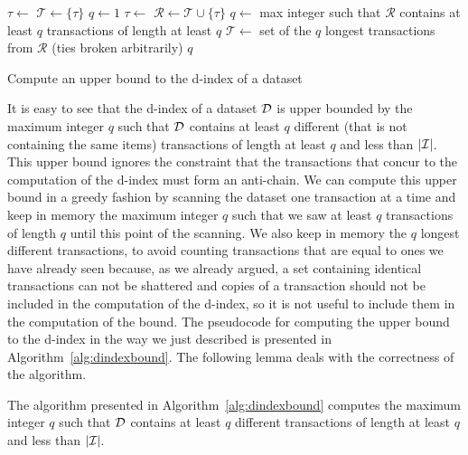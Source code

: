 \begin{algorithm}[htb]
  \DontPrintSemicolon
  $\tau\leftarrow$ \GetNextTransaction{$\Ds$}\;
  $\mathcal{T}\leftarrow\{\tau\}$\;
  $q\leftarrow 1$\;
  \While{\ScanIsNotComplete} {
  $\tau\leftarrow$ \GetNextTransaction{$\Ds$}\;
   {
  $\mathcal{R}\leftarrow \mathcal{T}\cup\{\tau\}$\;
  $q \leftarrow$ max integer such that $\mathcal{R}$ contains at least $q$ transactions
    of length at least $q$\;
    $\mathcal{T}\leftarrow$ set of the $q$ longest transactions from $\mathcal{R}$ (ties broken
    arbitrarily)\;
  }
  }
  \Return $q$\;
  \caption{Compute an upper bound to the d-index of a
  dataset}\label{alg:dindexbound}
\end{algorithm}

It is easy to see that the d-index of a dataset $\Ds$ is upper bounded by the
maximum integer $q$ such that $\Ds$ contains at least $q$ different (that is not
containing the same items) transactions of length at least $q$ and less than
$|{\cal I}|$. This upper bound ignores the constraint that the transactions that
concur to the computation of the d-index must form an anti-chain. We can compute
this upper bound in a greedy fashion by scanning the dataset one transaction at
a time and keep in memory the maximum integer $q$ such that we saw at least $q$
transactions of length $q$ until this point of the scanning. We also keep in
memory the $q$ longest different transactions, to avoid counting transactions that
are equal to ones we have already seen because, as we already argued, a set
containing identical transactions can not be shattered and copies of a
transaction should not be included in the computation of the d-index, so it is
not useful to include them in the computation of the bound. The pseudocode for
computing the upper bound to the d-index in the way we just described is
presented in Algorithm~\ref{alg:dindexbound}. The following lemma deals with the
correctness of the algorithm.

\begin{lemma}\label{lem:algocorrect}
  The algorithm presented in Algorithm~\ref{alg:dindexbound} computes the maximum
  integer $q$ such that $\Ds$ contains at least $q$ different transactions of
  length at least $q$ and less than $|{\cal I}|$.
\end{lemma}

